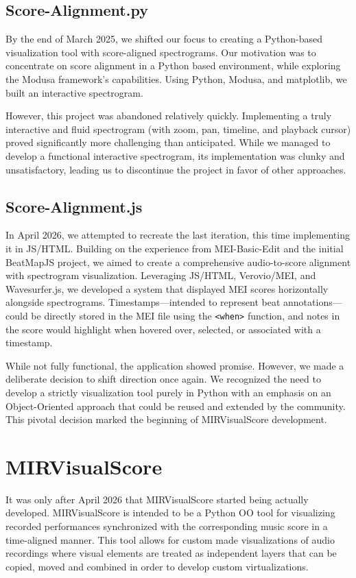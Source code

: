 \subsection{Score-Alignment.py}
By the end of March 2025, we shifted our focus to creating a Python-based visualization tool with score-aligned spectrograms. Our motivation was to concentrate on score alignment in a Python based environment, while exploring the Modusa framework's capabilities. Using Python, Modusa, and matplotlib, we built an interactive spectrogram.

However, this project was abandoned relatively quickly. Implementing a truly interactive and fluid spectrogram (with zoom, pan, timeline, and playback cursor) proved significantly more challenging than anticipated. While we managed to develop a functional interactive spectrogram, its implementation was clunky and unsatisfactory, leading us to discontinue the project in favor of other approaches. 

\subsection{Score-Alignment.js}
In April 2026, we attempted to recreate the last iteration, this time implementing it in JS/HTML. Building on the experience from MEI-Basic-Edit and the initial BeatMapJS project, we aimed to create a comprehensive audio-to-score alignment with spectrogram visualization. Leveraging JS/HTML, Verovio/MEI, and Wavesurfer.js, we developed a system that displayed MEI scores horizontally alongside spectrograms. Timestamps—intended to represent beat annotations—could be directly stored in the MEI file using the \texttt{<when>} function, and notes in the score would highlight when hovered over, selected, or associated with a timestamp.

While not fully functional, the application showed promise. However, we made a deliberate decision to shift direction once again. We recognized the need to develop a strictly visualization tool purely in Python with an emphasis on an Object-Oriented approach that could be reused and extended by the community. This pivotal decision marked the beginning of MIRVisualScore development.

\section{MIRVisualScore}
It was only after April 2026 that MIRVisualScore started being actually developed. MIRVisualScore is intended to be a Python OO tool for visualizing recorded performances synchronized with the corresponding music score in a time-aligned manner. This tool allows for custom made visualizations of audio recordings where visual elements are treated as independent layers that can be copied, moved and combined in order to develop custom virtualizations. 

